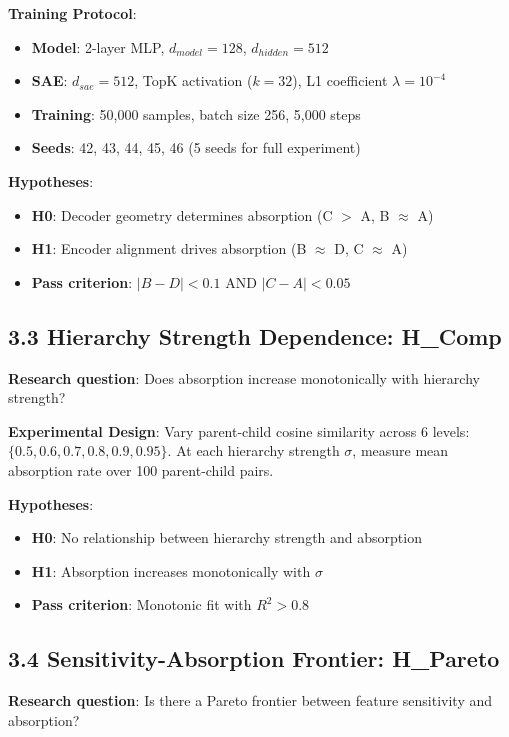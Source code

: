 \documentclass{article}
\begin{document}
\textbf{Training Protocol}:
\begin{itemize}
\item \textbf{Model}: 2-layer MLP, $d_{model} = 128$, $d_{hidden} = 512$
\item \textbf{SAE}: $d_{sae} = 512$, TopK activation ($k=32$), L1 coefficient $\lambda = 10^{-4}$
\item \textbf{Training}: 50,000 samples, batch size 256, 5,000 steps
\item \textbf{Seeds}: 42, 43, 44, 45, 46 (5 seeds for full experiment)
\end{itemize}

\textbf{Hypotheses}:
\begin{itemize}
\item \textbf{H0}: Decoder geometry determines absorption (C $>$ A, B $\approx$ A)
\item \textbf{H1}: Encoder alignment drives absorption (B $\approx$ D, C $\approx$ A)
\item \textbf{Pass criterion}: $|B - D| < 0.1$ AND $|C - A| < 0.05$
\end{itemize}

\subsection{3.3 Hierarchy Strength Dependence: H\_Comp}

\textbf{Research question}: Does absorption increase monotonically with hierarchy strength?

\textbf{Experimental Design}: Vary parent-child cosine similarity across 6 levels: $\{0.5, 0.6, 0.7, 0.8, 0.9, 0.95\}$. At each hierarchy strength $\sigma$, measure mean absorption rate over 100 parent-child pairs.

\textbf{Hypotheses}:
\begin{itemize}
\item \textbf{H0}: No relationship between hierarchy strength and absorption
\item \textbf{H1}: Absorption increases monotonically with $\sigma$
\item \textbf{Pass criterion}: Monotonic fit with $R^2 > 0.8$
\end{itemize}

\subsection{3.4 Sensitivity-Absorption Frontier: H\_Pareto}

\textbf{Research question}: Is there a Pareto frontier between feature sensitivity and absorption?
\end{document}
